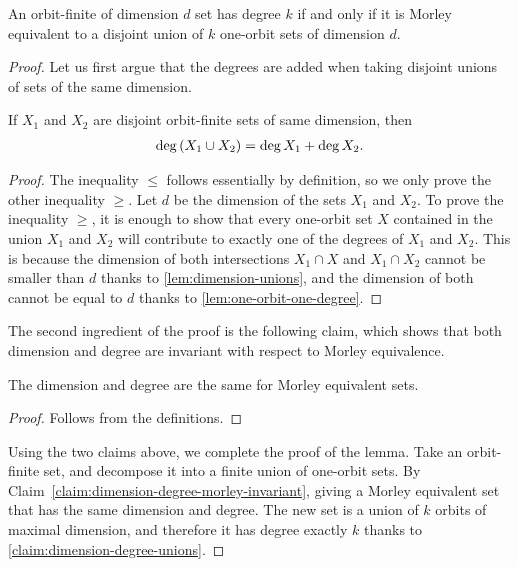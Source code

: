 \begin{lemma}\label{lem:signature-in-terms-of-orbits}
    An orbit-finite of dimension $d$ set has degree $k$ if and only if it is Morley equivalent to a disjoint union of $k$ one-orbit sets of dimension $d$.
\end{lemma}
\begin{proof}
    Let us first argue that the degrees are added when taking disjoint unions of sets of the same dimension. 

    \begin{claim}\label{claim:dimension-degree-unions}
        If $X_1$ and $X_2$ are disjoint orbit-finite sets of same dimension, then 
        \begin{align*}
        \operatorname{deg}{(X_1 \cup X_2)} = \operatorname{deg}{X_1} + \operatorname{deg}{X_2}.
        \end{align*}
    \end{claim}
    \begin{proof}
        The inequality $\leq$ follows essentially by definition, so we only prove the  other inequality $\geq$. Let $d$ be the dimension of the sets $X_1$ and $X_2$. To prove the inequality $\geq$, it is enough to show that every one-orbit set $X$ contained in the union $X_1$ and $X_2$ will contribute to exactly one of the degrees of $X_1$ and $X_2$. This is because the dimension of both intersections $X_1 \cap X$ and $X_1 \cap X_2$ cannot be smaller than $d$ thanks to \cref{lem:dimension-unions}, and the dimension of both cannot be equal to $d$ thanks to \cref{lem:one-orbit-one-degree}.
    \end{proof}

    The second ingredient of the proof is the following claim, which shows that both dimension and degree are invariant with respect to Morley equivalence. 
    \begin{claim}
        \label{claim:dimension-degree-morley-invariant}
        The dimension and degree are the same for Morley equivalent sets.
    \end{claim}
    \begin{proof}
        Follows from the definitions.
    \end{proof}

    Using the two claims above, we complete the proof of the lemma. Take an orbit-finite set, and decompose it into a finite union of one-orbit sets. By Claim~\ref{claim:dimension-degree-morley-invariant}, giving a Morley equivalent set that has the same  dimension and degree.  The new set is a union of $k$ orbits of maximal dimension, and therefore it has degree exactly $k$ thanks to \cref{claim:dimension-degree-unions}. 
\end{proof}


